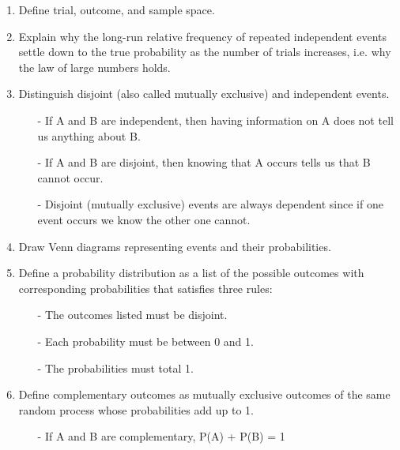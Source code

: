 \documentclass[11pt]{article}
\begin{document}
\begin{enumerate}
\renewcommand\labelenumi{\textcolor{light}{\textbf{LO \theenumi.}}}

\item Define trial, outcome, and sample space.

\item Explain why the long-run relative frequency of repeated independent events settle down to the true probability as the number of trials increases, i.e. why the law of large numbers holds.

\item Distinguish disjoint (also called mutually exclusive) and independent events.
\begin{itemize}
\item[-] If A and B are independent, then having information on A does not tell us anything about B.
\item[-] If A and B are disjoint, then knowing that A occurs tells us that B cannot occur.
\item[-] Disjoint (mutually exclusive) events are always dependent since if one event occurs we know the other one cannot.
\end{itemize}

\item Draw Venn diagrams representing events and their probabilities.

\item Define a probability distribution as a list of the possible outcomes with corresponding probabilities that satisfies three rules: 
\begin{itemize}
\item[-] The outcomes listed must be disjoint. 
\item[-] Each probability must be between 0 and 1.
\item[-] The probabilities must total 1. 
\end{itemize}

\item Define complementary outcomes as mutually exclusive outcomes of the same random process whose probabilities add up to 1. 
\begin{itemize}
\item[-] If A and B are complementary, P(A) + P(B) = 1 
\end{itemize}


\end{enumerate}
\end{document}
